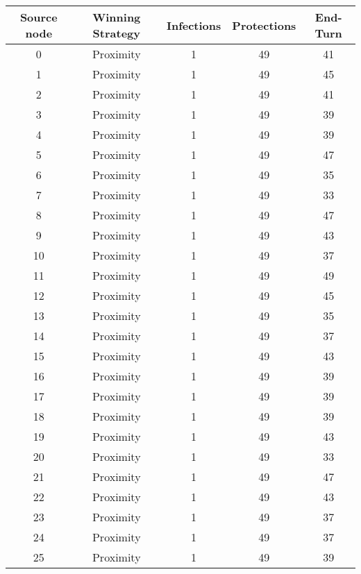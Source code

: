 \documentclass[results.tex]{subfiles}
\begin{document}
\begin{center}
  \begin{tabular}{| c || c | c | c | c |}
    \hline
    {\bfseries Source node} & {\bfseries Winning Strategy} & {\bfseries Infections} & {\bfseries Protections} & {\bfseries End-Turn} \\  %
    \hline\hline
    0 & Proximity & 1 & 49 & 41 \\ 
    \hline
    1 & Proximity & 1 & 49 & 45 \\ 
    \hline
    2 & Proximity & 1 & 49 & 41 \\ 
    \hline
    3 & Proximity & 1 & 49 & 39 \\ 
    \hline
    4 & Proximity & 1 & 49 & 39 \\ 
    \hline
    5 & Proximity & 1 & 49 & 47 \\ 
    \hline
    6 & Proximity & 1 & 49 & 35 \\ 
    \hline
    7 & Proximity & 1 & 49 & 33 \\ 
    \hline
    8 & Proximity & 1 & 49 & 47 \\ 
    \hline
    9 & Proximity & 1 & 49 & 43 \\ 
    \hline
    10 & Proximity & 1 & 49 & 37 \\ 
    \hline
    11 & Proximity & 1 & 49 & 49 \\ 
    \hline
    12 & Proximity & 1 & 49 & 45 \\ 
    \hline
    13 & Proximity & 1 & 49 & 35 \\ 
    \hline
    14 & Proximity & 1 & 49 & 37 \\ 
    \hline
    15 & Proximity & 1 & 49 & 43 \\ 
    \hline
    16 & Proximity & 1 & 49 & 39 \\ 
    \hline
    17 & Proximity & 1 & 49 & 39 \\ 
    \hline
    18 & Proximity & 1 & 49 & 39 \\ 
    \hline
    19 & Proximity & 1 & 49 & 43 \\ 
    \hline
    20 & Proximity & 1 & 49 & 33 \\ 
    \hline
    21 & Proximity & 1 & 49 & 47 \\ 
    \hline
    22 & Proximity & 1 & 49 & 43 \\ 
    \hline
    23 & Proximity & 1 & 49 & 37 \\ 
    \hline
    24 & Proximity & 1 & 49 & 37 \\ 
    \hline
    25 & Proximity & 1 & 49 & 39 \\ 

\end{tabular}
\end{center}
\end{document}
